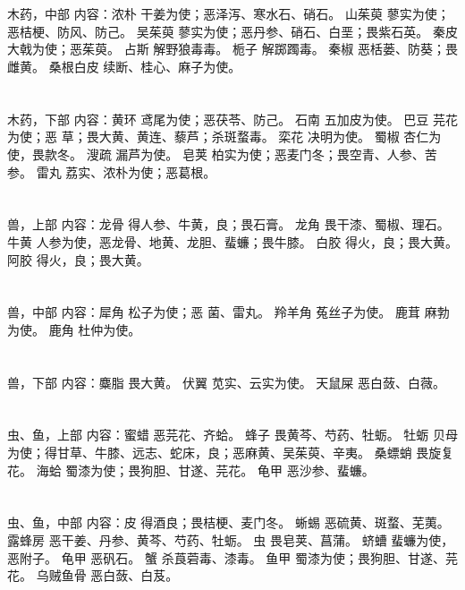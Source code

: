 \documentclass[12pt,UTF8]{ctexbook}
\begin{document}
\section{}木药，中部
内容：浓朴 干姜为使；恶泽泻、寒水石、硝石。 
山茱萸 蓼实为使；恶桔梗、防风、防己。 
吴茱萸 蓼实为使；恶丹参、硝石、白垩；畏紫石英。 
秦皮 大戟为使；恶茱萸。 
占斯 解野狼毒毒。 
栀子 解踯躅毒。 
秦椒 恶栝蒌、防葵；畏雌黄。 
桑根白皮 续断、桂心、麻子为使。 


\section{}木药，下部
内容：黄环 鸢尾为使；恶茯苓、防己。 
石南 五加皮为使。 
巴豆 芫花为使；恶 草；畏大黄、黄连、藜芦；杀斑蝥毒。 
栾花 决明为使。 
蜀椒 杏仁为使，畏款冬。 
溲疏 漏芦为使。 
皂荚 柏实为使；恶麦门冬；畏空青、人参、苦参。 
雷丸 荔实、浓朴为使；恶葛根。 


\section{}兽，上部
内容：龙骨 得人参、牛黄，良；畏石膏。 
龙角 畏干漆、蜀椒、理石。 
牛黄 人参为使，恶龙骨、地黄、龙胆、蜚蠊；畏牛膝。 
白胶 得火，良；畏大黄。 
阿胶 得火，良；畏大黄。 


\section{}兽，中部
内容：犀角 松子为使；恶 菌、雷丸。 
羚羊角 菟丝子为使。 
鹿茸 麻勃为使。 
鹿角 杜仲为使。 


\section{}兽，下部
内容：麋脂 畏大黄。 
伏翼 苋实、云实为使。 
天鼠屎 恶白蔹、白薇。 


\section{}虫、鱼，上部
内容：蜜蜡 恶芫花、齐蛤。 
蜂子 畏黄芩、芍药、牡蛎。 
牡蛎 贝母为使；得甘草、牛膝、远志、蛇床，良；恶麻黄、吴茱萸、辛夷。 
桑螵蛸 畏旋复花。 
海蛤 蜀漆为使；畏狗胆、甘遂、芫花。 
龟甲 恶沙参、蜚蠊。 


\section{}虫、鱼，中部
内容：皮 得酒良；畏桔梗、麦门冬。 
蜥蜴 恶硫黄、斑蝥、芜荑。 
露蜂房 恶干姜、丹参、黄芩、芍药、牡蛎。 
虫 畏皂荚、菖蒲。 
蛴螬 蜚蠊为使，恶附子。 
龟甲 恶矾石。 
蟹 杀莨菪毒、漆毒。 
鱼甲 蜀漆为使；畏狗胆、甘遂、芫花。 
乌贼鱼骨 恶白蔹、白芨。 
\end{document}
